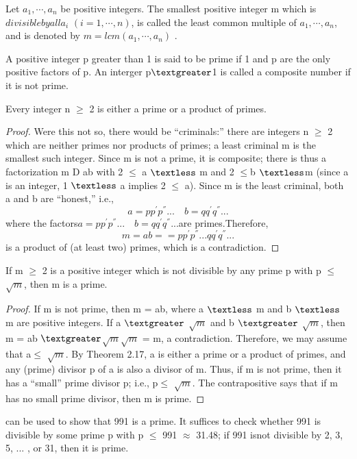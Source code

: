 \documentclass[cn,10pt,math=newtx,citestyle=gb7714-2015,bibstyle=gb7714-2015]{elegantbook}
\begin{document}
\begin{definition}
    Let $a_1,\cdots,a_n$ be positive integers. 
The smallest positive integer m which is 
$divisible by all $$a_i$ $(i=1,\cdots,n)$, is called the least common multiple of $a_1,\cdots,a_n$, and is denoted by $m=lcm(a_1,\cdots,a_n)$ .
\end{definition}







\begin{definition}
    

    A positive integer p greater than 1 is said to be prime if 1 and p are the only positive factors of p. An interger p$\textgreater$1 is called a composite number if it is not prime.
\end{definition}

\begin{theorem}
    Every integer n $\geq$ 2 is either a prime or a product of primes.
\end{theorem}
\begin{proof}
    Were this not so, there would be “criminals:” there are integers n $\geq$ 2 which are neither primes nor products of primes; a least criminal m is the
smallest such integer. Since m is not a prime, it is composite; there is thus a
factorization m D ab with 2 $\leq$ a $\textless$ m and 2 $\leq$b $\textless$m (since a is an integer,
1 $\textless$ a implies 2  $\leq$  a). Since m is the least criminal, both a and b are “honest,”
i.e.,\begin{equation*}
    a=pp^{'}p^{''}... \quad b=qq^{'}q^{''} ...
\end{equation*}
where the factors$a=pp^{'}p^{''}... \quad b=qq^{'}q^{''} ...$are primes.Therefore,
\begin{equation*}
    m=ab==pp^{'}p^{''}...qq^{'}q^{''} ...
\end{equation*}
is a product of (at least two) primes, which is a contradiction.
\end{proof}
\begin{proposition}
    If m $\geq$ 2 is a positive integer which is not divisible by any
prime p with p $\leq$ $\sqrt{m}$, then m is a prime.
\end{proposition}
\begin{proof}
    If m is not prime, then m = ab, where a $\textless$ m and b $\textless$ m are positive
integers. If a $\textgreater$ $\sqrt{m}$ and b $\textgreater$ $\sqrt{m}$, then m = ab $\textgreater$$\sqrt{m}$$\sqrt{m}$ = m, a contradiction.
Therefore, we may assume that a$\leq$ $\sqrt{m}$. By Theorem 2.17, a is either a
prime or a product of primes, and any (prime) divisor p of a is also a divisor of
m. Thus, if m is not prime, then it has a “small” prime divisor p; i.e., p$\leq$ $\sqrt{m}$.
The contrapositive says that if m has no small prime divisor, then m is prime. 
\end{proof}
\begin{note}
    can be used to show that 991 is a prime. It suffices to check
whether 991 is divisible by some prime p with p $\leq$
991 $\approx$ 31.48; if 991 isnot divisible by 2, 3, 5, ... , or 31, then it is prime.
\end{note}
\end{document}

